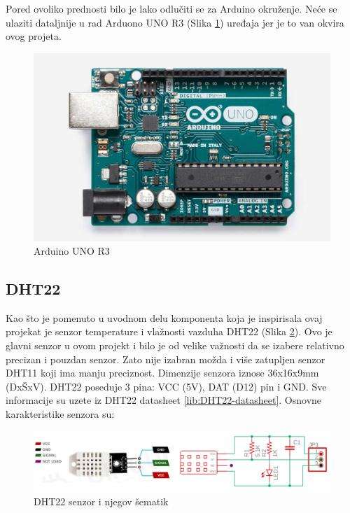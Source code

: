 \documentclass[a4paper, 12pt]{article}
\begin{document}
\vspace{10pt}

\sloppypar
Pored ovoliko prednosti bilo je lako odlučiti se za Arduino okruženje. Neće se ulaziti dataljnije u rad Arduono UNO R3 (Slika \ref{fig:Arduino}) uređaja jer je to van okvira ovog projeta. 

\begin{figure}[H]
\centering
\includegraphics[scale=0.17]{images/Arduino UNO R3}
\caption{Arduino UNO R3} \label{fig:Arduino}
\end{figure}

\pagebreak


	\subsection{DHT22}

\vspace{10pt}

Kao što je pomenuto u uvodnom delu komponenta koja je inspirisala ovaj projekat je senzor temperature i vlažnosti vazduha DHT22 (Slika \ref{fig:dht22pinssch}). Ovo je glavni senzor u ovom projekt i bilo je od velike važnosti da se izabere relativno precizan i pouzdan senzor. Zato nije izabran možda i više zatupljen senzor DHT11 koji ima manju preciznost. Dimenzije senzora iznose 36x16x9mm (DxŠxV). DHT22 poseduje 3 pina: VCC (5V), DAT (D12) pin i GND. Sve informacije su uzete iz DHT22 datasheet \ref{lib:DHT22-datasheet}. Osnovne karakteristike senzora su:

\begin{figure}[H]
\centering
\includegraphics[scale=0.4]{images/dht22pinssch}
\caption{DHT22 senzor i njegov šematik} \label{fig:dht22pinssch}
\end{figure}
\end{document}
